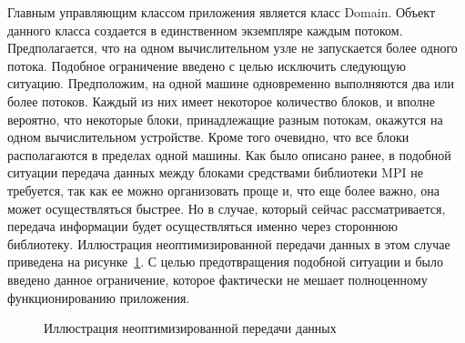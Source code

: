 \documentclass[a4paper, 14pt]{extarticle}
\theoremstyle{definition}
\begin{document}
\par Главным управляющим классом приложения является класс Domain. Объект данного класса создается в единственном экземпляре каждым потоком. Предполагается, что на одном вычислительном узле не запускается более одного потока. Подобное ограничение введено с целью исключить следующую ситуацию. Предположим, на одной машине одновременно выполняются два или более потоков. Каждый из них имеет некоторое количество блоков, и вполне вероятно, что некоторые блоки, принадлежащие разным потокам, окажутся на одном вычислительном устройстве. Кроме того очевидно, что все блоки располагаются в пределах одной машины. Как было описано ранее, в подобной ситуации передача данных между блоками средствами библиотеки MPI не требуется, так как ее можно организовать проще и, что еще более важно, она может осуществляться быстрее. Но в случае, который сейчас рассматривается, передача информации будет осуществляться именно через стороннюю библиотеку. Иллюстрация неоптимизированной передачи данных в этом случае приведена на рисунке~\ref{ris:error_ex}. С целью предотвращения подобной ситуации и было введено данное ограничение, которое фактически не мешает полноценному функционированию приложения.
\begin{figure}[h]
	\caption{Иллюстрация неоптимизированной передачи данных}
	\label{ris:error_ex}
\end{figure}
\end{document}
